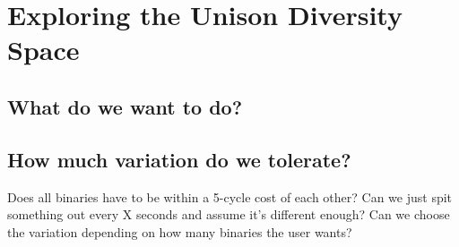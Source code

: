 \chapter{Exploring the Unison Diversity Space}

\section{What do we want to do?}


\section{How much variation do we tolerate?}

Does all binaries have to be within a 5-cycle cost of each other? Can we just spit something
out every X seconds and assume it's different enough? Can we choose the variation depending
on how many binaries the user wants?
